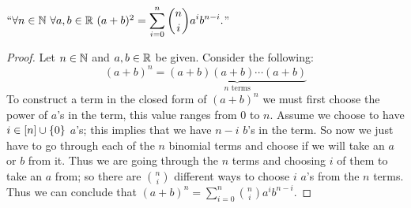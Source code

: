         \begin{theorem}
            $``\forall n \in \mathbb{N} \ \forall a, b \in \mathbb{R} \ (a + b)^2 = \displaystyle\sum_{i = 0}^{n} \binom{n}{i}a^ib^{n - i}.$''
            \label{Binomial Theorem}
        \end{theorem}
        \begin{proof}
            Let $n \in \mathbb{N}$ and $a, b \in \mathbb{R}$ be given. Consider the following:
            \[
                (a + b)^n = \underbrace{(a + b)(a + b) \cdots (a + b)}_{\mbox{$n$ terms}}
            \]
            To construct a term in the closed form of $(a + b)^n$ we must first choose the power
            of $a$'s in the term, this value ranges from 0 to $n$. Assume we choose to have
            $i \in [n] \cup \left\{0\right\}$ $a$'s; this
            implies that we have $n - i$ $b$'s in the term. So now we just have to go through each
            of the $n$ binomial terms and choose if we will take an $a$ or $b$ from it. Thus we
            are going through the $n$ terms and choosing $i$ of them to take an $a$ from; so there
            are $\binom{n}{i}$ different ways to choose $i$ $a$'s from the $n$ terms. Thus we can
            conclude that $(a + b)^n = \sum_{i = 0}^{n} \binom{n}{i} a^ib^{n - i}$. \QED
        \end{proof}
